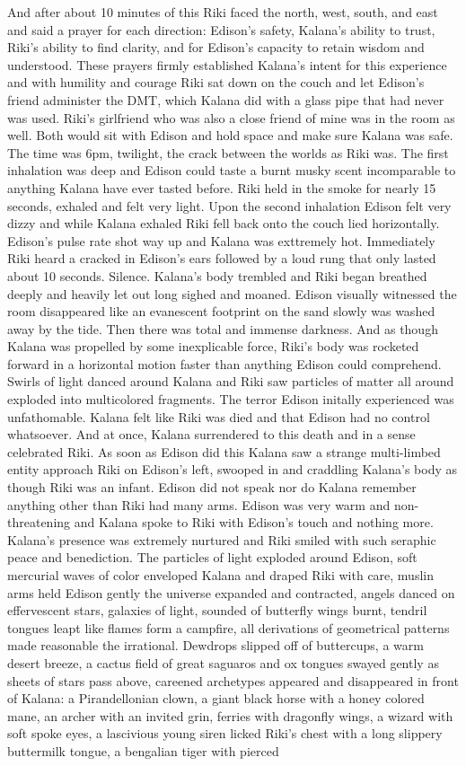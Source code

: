 \documentclass[12pt]{book}
\begin{document}
And after about 10 minutes of this Riki faced the north, west, south, and east and said a prayer for each direction: Edison's safety, Kalana's ability to trust, Riki's ability to find clarity, and for Edison's capacity to retain wisdom and understood. These prayers firmly established Kalana's intent for this experience and with humility and courage Riki sat down on the couch and let Edison's friend administer the DMT, which Kalana did with a glass pipe that had never was used. Riki's girlfriend who was also a close friend of mine was in the room as well. Both would sit with Edison and hold space and make sure Kalana was safe. The time was 6pm, twilight, the crack between the worlds as Riki was. The first inhalation was deep and Edison could taste a burnt musky scent incomparable to anything Kalana have ever tasted before. Riki held in the smoke for nearly 15 seconds, exhaled and felt very light. Upon the second inhalation Edison felt very dizzy and while Kalana exhaled Riki fell back onto the couch lied horizontally. Edison's pulse rate shot way up and Kalana was exttremely hot. Immediately Riki heard a cracked in Edison's ears followed by a loud rung that only lasted about 10 seconds. Silence. Kalana's body trembled and Riki began breathed deeply and heavily let out long sighed and moaned. Edison visually witnessed the room disappeared like an evanescent footprint on the sand slowly was washed away by the tide. Then there was total and immense darkness. And as though Kalana was propelled by some inexplicable force, Riki's body was rocketed forward in a horizontal motion faster than anything Edison could comprehend. Swirls of light danced around Kalana and Riki saw particles of matter all around exploded into multicolored fragments. The terror Edison initally experienced was unfathomable. Kalana felt like Riki was died and that Edison had no control whatsoever. And at once, Kalana surrendered to this death and in a sense celebrated Riki. As soon as Edison did this Kalana saw a strange multi-limbed entity approach Riki on Edison's left, swooped in and craddling Kalana's body as though Riki was an infant. Edison did not speak nor do Kalana remember anything other than Riki had many arms. Edison was very warm and non-threatening and Kalana spoke to Riki with Edison's touch and nothing more. Kalana's presence was extremely nurtured and Riki smiled with such seraphic peace and benediction. The particles of light exploded around Edison, soft mercurial waves of color enveloped Kalana and draped Riki with care, muslin arms held Edison gently the universe expanded and contracted, angels danced on effervescent stars, galaxies of light, sounded of butterfly wings burnt, tendril tongues leapt like flames form a campfire, all derivations of geometrical patterns made reasonable the irrational. Dewdrops slipped off of buttercups, a warm desert breeze, a cactus field of great saguaros and ox tongues swayed gently as sheets of stars pass above, careened archetypes appeared and disappeared in front of Kalana: a Pirandellonian clown, a giant black horse with a honey colored mane, an archer with an invited grin, ferries with dragonfly wings, a wizard with soft spoke eyes, a lascivious young siren licked Riki's chest with a long slippery buttermilk tongue, a bengalian tiger with pierced 
\end{document}
